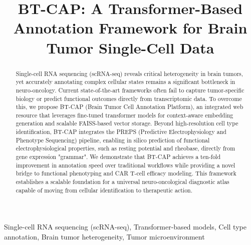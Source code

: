 \documentclass[conference]{IEEEtran}
\begin{document}
\title{BT-CAP: A Transformer-Based Annotation Framework for Brain Tumor Single-Cell Data
\\}

\author{
\and
{}
}

\maketitle

\begin{abstract}
Single-cell RNA sequencing (scRNA-seq) reveals critical heterogeneity in brain tumors, yet accurately annotating complex cellular states remains a significant bottleneck in neuro-oncology. Current state-of-the-art frameworks often fail to capture tumor-specific biology or predict functional outcomes directly from transcriptomic data. To overcome this, we propose BT-CAP (Brain Tumor Cell Annotation Platform), an integrated web resource that leverages fine-tuned transformer models for context-aware embedding generation and scalable FAISS-based vector storage. Beyond high-resolution cell type identification, BT-CAP integrates the PREPS (Predictive Electrophysiology and Phenotype Sequencing) pipeline, enabling in silico prediction of functional electrophysiological properties, such as resting potential and rheobase, directly from gene expression "grammar". We demonstrate that BT-CAP achieves a ten-fold improvement in annotation speed over traditional workflows while providing a novel bridge to functional phenotyping and CAR T-cell efficacy modeling. This framework establishes a scalable foundation for a universal neuro-oncological diagnostic atlas capable of moving from cellular identification to therapeutic action.
\end{abstract}

\begin{IEEEkeywords}
Single-cell RNA sequencing (scRNA-seq), Transformer-based models, Cell type annotation, Brain tumor heterogeneity, Tumor microenvironment
\end{IEEEkeywords}
\end{document}
